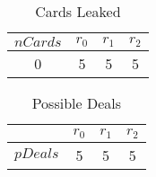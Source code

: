 \documentclass{article}
\begin{document}
\begin{table}[ht] 
\begin{tabular}{ | c || c | c | c  | } 
 \hline 
$nCards$  & $r_{0}$ & $r_{1}$ & $r_{2}$ \\ 
 \hline 
0 & 5 & 5 & 5 \\ 
\end{tabular}
\caption{Cards Leaked}
\label{cLeaked}
\end{table}

\begin{table}[ht] 
\begin{tabular}{ | c || c | c | c  | } 
\hline$\;$   & $r_{0}$ & $r_{1}$ & $r_{2}$ \\ 
\hline 
$pDeals$ & 5  & 5  & 5  \\ 
\hline 
\end{tabular}
\caption{Possible Deals}
\label{pDeals}
\end{table}









\end{document}
